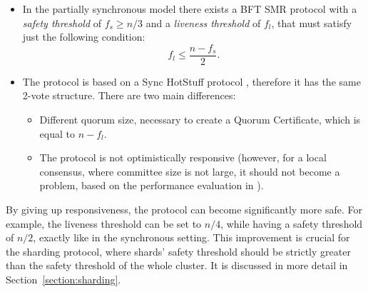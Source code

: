  \begin{itemize}
     \item In the partially synchronous model there exists a BFT SMR protocol with a \emph{safety threshold} of \(f_s \geq n/3 \) and a \emph{liveness threshold} of \(f_l\), that
     must satisfy just the following condition:
     $$
     f_l \leq \frac{n - f_s}{2}.
     $$
     \item The protocol is based on a Sync HotStuff protocol \cite{SyncHotStuff}, therefore it has the same 2-vote structure.
     There are two main differences:
     \begin{itemize}
         \item Different quorum size, necessary to create a Quorum Certificate, which is equal to \(n - f_l\).
         \item The protocol is not optimistically responsive (however, for a local consensus, where committee size is not large, it should not become a problem, based on the performance evaluation in \cite{SyncHotStuff}).
     \end{itemize}
 \end{itemize}
 
 \begin{remark}
     By giving up responsiveness, the protocol can become significantly more safe. For example, the liveness threshold can be set to $n/4$,
     while having a safety threshold of $n/2$, exactly like in the synchronous setting.
     This improvement is crucial for the sharding protocol, where shards' safety threshold should be strictly greater than the safety threshold of the whole cluster.
     It is discussed in more detail in Section~\ref{section:sharding}.
 \end{remark}